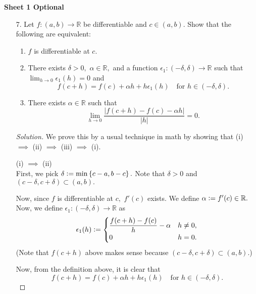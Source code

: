 \documentclass[12pt]{article}
\theoremstyle{definition}
\newenvironment{soln}{\begin{proof}[Solution]}{\end{proof}}
\begin{document}
\newpage
\textbf{Sheet 1 Optional}
\begin{itemize}
	\item[7.] Let $f:(a, b) \to \mathbb{R}$ be differentiable and $c \in (a, b).$ Show that the following are equivalent:
	\begin{enumerate}[label = (\roman*)]
		\item $f$ is differentiable at $c.$
		\item There exists $\delta > 0,$ $\alpha \in \mathbb{R},$ and a function $\epsilon_1:(-\delta, \delta) \to \mathbb{R}$ such that $\lim_{h\to 0}\epsilon_1(h) = 0$ and
		\begin{equation*} 
			f(c + h) = f(c) + \alpha h + h\epsilon_1(h) \quad\text{for } h \in (-\delta, \delta).
		\end{equation*}
		\item There exists $\alpha \in \mathbb{R}$ such that
		\begin{equation*} 
			\lim_{h\to 0}\dfrac{\left|f(c + h) - f(c) - \alpha h\right|}{|h|} = 0.
		\end{equation*}
	\end{enumerate}
	\begin{soln}
		We prove this by a usual technique in math by showing that (i) $\implies$ (ii) $\implies$ (iii) $\implies$ (i).

		\hrulefill

		(i) $\implies$ (ii)\\
		First, we pick $\delta \vcentcolon= \min\left\{c - a, b - c\right\}.$ Note that $\delta > 0$ and $(c - \delta, c + \delta) \subset (a, b).$

		Now, since $f$ is differentiable at $c,$ $f'(c)$ exists. We define $\alpha \vcentcolon= f'(c) \in \mathbb{R}.$ \\
		Now, we define $\epsilon_1:(-\delta, \delta) \to \mathbb{R}$ as
		\begin{equation*} 
			\epsilon_1(h) \vcentcolon= \begin{cases}
				\dfrac{f(c + h) - f(c)}{h} - \alpha & h \neq 0,\\
				0 & h = 0.
			\end{cases}
		\end{equation*}
		(Note that $f(c + h)$ above makes sense because $(c - \delta, c + \delta) \subset (a, b).$)

		Now, from the definition above, it is clear that
		\begin{equation*} 
			f(c + h) = f(c) + \alpha h + h\epsilon_1(h) \quad\text{for } h \in (-\delta, \delta).
		\end{equation*}


\end{soln}
\end{itemize}
\end{document}
